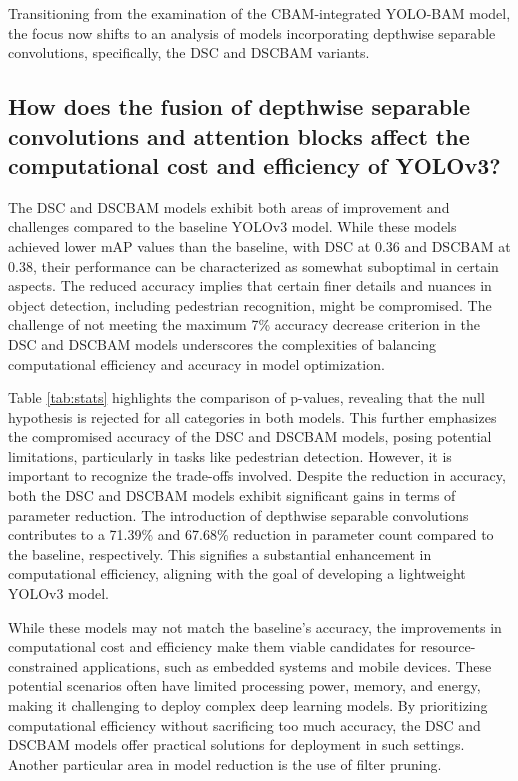 Transitioning from the examination of the CBAM-integrated YOLO-BAM model, the focus now shifts to an analysis of models incorporating depthwise separable convolutions, specifically, the DSC and DSCBAM variants.

\subsection{How does the fusion of depthwise separable convolutions and attention blocks affect the computational cost and efficiency of YOLOv3?}
The DSC and DSCBAM models exhibit both areas of improvement and challenges compared to the baseline YOLOv3 model. While these models achieved lower mAP values than the baseline, with DSC at 0.36 and DSCBAM at 0.38, their performance can be characterized as somewhat suboptimal in certain aspects. The reduced accuracy implies that certain finer details and nuances in object detection, including pedestrian recognition, might be compromised. The challenge of not meeting the maximum 7\% accuracy decrease criterion in the DSC and DSCBAM models underscores the complexities of balancing computational efficiency and accuracy in model optimization.

Table \ref{tab:stats} highlights the comparison of p-values, revealing that the null hypothesis is rejected for all categories in both models. This further emphasizes the compromised accuracy of the DSC and DSCBAM models, posing potential limitations, particularly in tasks like pedestrian detection. However, it is important to recognize the trade-offs involved. Despite the reduction in accuracy, both the DSC and DSCBAM models exhibit significant gains in terms of parameter reduction. The introduction of depthwise separable convolutions contributes to a 71.39\% and 67.68\% reduction in parameter count compared to the baseline, respectively. This signifies a substantial enhancement in computational efficiency, aligning with the goal of developing a lightweight YOLOv3 model.

While these models may not match the baseline's accuracy, the improvements in computational cost and efficiency make them viable candidates for resource-constrained applications, such as embedded systems and mobile devices. These potential scenarios often have limited processing power, memory, and energy, making it challenging to deploy complex deep learning models. By prioritizing computational efficiency without sacrificing too much accuracy, the DSC and DSCBAM models offer practical solutions for deployment in such settings. Another particular area in model reduction is the use of filter pruning.

